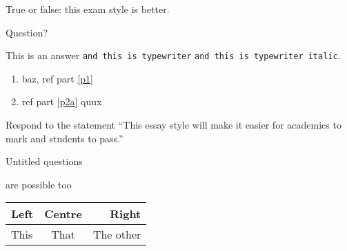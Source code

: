 \documentclass{gsexam}
\begin{document}
\begin{bscexam}[fifteen]


\coverpage

\begin{part}{1}{1}{40}

\begin{question}{40}
  True or false: this exam style is better.  
\end{question}
\end{part}

\begin{part}{3}{2}{60}

\begin{question}{25}
\item \label{p1} Question? 
  \begin{answer}
  This is an answer {\tt and this is typewriter} \texttt{and this is
    typewriter italic}.
\end{answer}
\item 
  \begin{enumerate}
  \item \label{p2a} baz, ref part \ref{p1} 
  \item ref part \ref{p2a} quux 
  \end{enumerate}
\end{question}
\begin{question}{30}
  Respond to the statement ``This essay style will make it easier for
  academics to mark and students to pass.'' 
\end{question}
\begin{question}{25}
\item Untitled questions 
\item are possible too 
\end{question}

\begin{question}{25}
\item \begin{tabular}{l|c|r}
        Left & Centre & Right\\
        \hline
        This & That & The other\\
      \end{tabular}
    \end{question}
  \end{part}

\end{bscexam}
\end{document}
